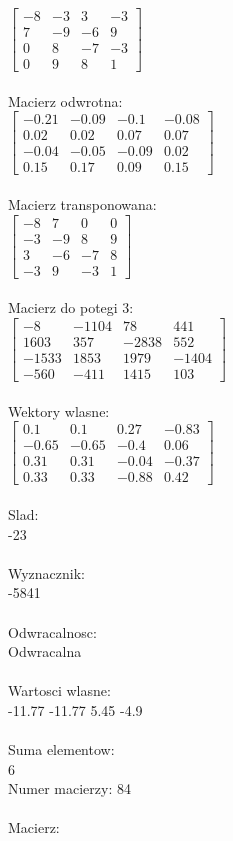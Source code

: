 \documentclass[a4paper,12pt]{article}
\begin{document}
$\begin{bmatrix} -8&-3&3&-3\\7&-9&-6&9\\0&8&-7&-3\\0&9&8&1 \end{bmatrix}$
\\
\\
Macierz odwrotna:\\

$\begin{bmatrix} -0.21&-0.09&-0.1&-0.08\\0.02&0.02&0.07&0.07\\-0.04&-0.05&-0.09&0.02\\0.15&0.17&0.09&0.15 \end{bmatrix}$
\\
\\
Macierz transponowana:\\

$\begin{bmatrix} -8&7&0&0\\-3&-9&8&9\\3&-6&-7&8\\-3&9&-3&1 \end{bmatrix}$
\\
\\
Macierz do potegi 3:\\

$\begin{bmatrix} -8&-1104&78&441\\1603&357&-2838&552\\-1533&1853&1979&-1404\\-560&-411&1415&103 \end{bmatrix}$
\\
\\
Wektory wlasne:\\

$\begin{bmatrix} 0.1&0.1&0.27&-0.83\\-0.65&-0.65&-0.4&0.06\\0.31&0.31&-0.04&-0.37\\0.33&0.33&-0.88&0.42 \end{bmatrix}$
\\
\\
Slad:\\
-23
\\
\\
Wyznacznik:\\
-5841
\\
\\
Odwracalnosc:\\
Odwracalna
\\
\\
Wartosci wlasne:\\
-11.77 -11.77 5.45 -4.9
\\
\\
Suma elementow:\\
6
\\
\newpage
Numer macierzy:
84
\\
\\
Macierz:\\
\end{document}
